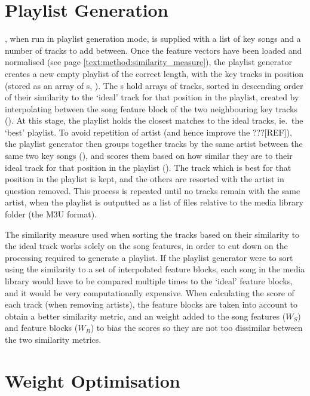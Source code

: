 \section{Playlist Generation}
, when run in playlist generation mode, is supplied with a list of key songs and a number of tracks to add between. Once the feature vectors have been loaded and normalised (see page \ref{text:method:similarity_measure}), the playlist generator creates a new empty playlist of the correct length, with the key tracks in position (stored as an array of s, ). The s hold arrays of tracks, sorted in descending order of their similarity to the `ideal' track for that position in the playlist, created by interpolating between the song feature block of the two neighbouring key tracks (). At this stage, the playlist holds the closest matches to the ideal tracks, ie.\ the `best' playlist. To avoid repetition of artist (and hence improve the ???[REF]), the playlist generator then groups together tracks by the same artist between the same two key songs (), and scores them based on how similar they are to their ideal track for that position in the playlist (). The track which is best for that position in the playlist is kept, and the others are resorted with the artist in question removed. This process is repeated until no tracks remain with the same artist, when the playlist is outputted as a list of files relative to the media library folder (the M3U format).

The similarity measure used when sorting the tracks based on their similarity to the ideal track works solely on the song features, in order to cut down on the processing required to generate a playlist. If the playlist generator were to sort using the similarity to a set of interpolated feature blocks, each song in the media library would have to be compared multiple times to the `ideal' feature blocks, and it would be very computationally expensive. When calculating the score of each track (when removing artists), the feature blocks are taken into account to obtain a better similarity metric, and an weight added to the song features ($W_S$) and feature blocks ($W_B$) to bias the scores so they are not too dissimilar between the two similarity metrics.
\section{Weight Optimisation}

